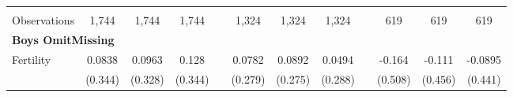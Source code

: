 \begin{landscape}
\begin{table}[htpb!]
\begin{center}
\begin{tabular}{lcccp{2mm}cccp{2mm}ccc}
\begin{footnotesize}\end{footnotesize}&\begin{footnotesize}\end{footnotesize}&\begin{footnotesize}\end{footnotesize}&\begin{footnotesize}\end{footnotesize}&\begin{footnotesize}\end{footnotesize}&\begin{footnotesize}\end{footnotesize}&\begin{footnotesize}\end{footnotesize}&\begin{footnotesize}\end{footnotesize}&\begin{footnotesize}\end{footnotesize}&\begin{footnotesize}\end{footnotesize}&\begin{footnotesize}\end{footnotesize}&\begin{footnotesize}\end{footnotesize}\\Observations&1,744&1,744&1,744&&1,324&1,324&1,324&&619&619&619\\
\multicolumn{12}{l}{\textbf{Boys OmitMissing}}\\ 
Fertility&0.0838&0.0963&0.128&&0.0782&0.0892&0.0494&&-0.164&-0.111&-0.0895\\
&(0.344)&(0.328)&(0.344)&&(0.279)&(0.275)&(0.288)&&(0.508)&(0.456)&(0.441)\\

\end{tabular}
\end{center}
\end{table}
\end{landscape}
